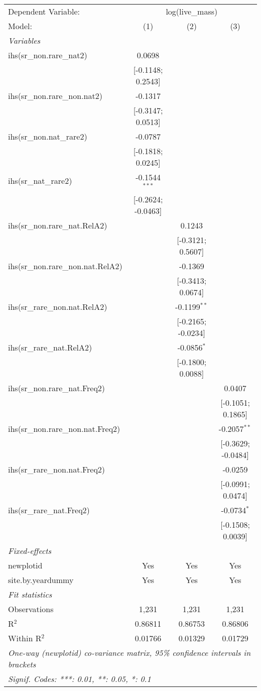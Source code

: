 \begin{tabular}{lccc}
\tabularnewline\midrule\midrule
Dependent Variable:&\multicolumn{3}{c}{log(live\_mass)}\\
Model:&(1) & (2) & (3)\\
\midrule \emph{Variables}&   &   &  \\
ihs(sr\_non.rare\_nat2)&0.0698 &    &   \\
  &[-0.1148; 0.2543] &    &   \\
ihs(sr\_non.rare\_non.nat2)&-0.1317 &    &   \\
  &[-0.3147; 0.0513] &    &   \\
ihs(sr\_non.nat\_rare2)&-0.0787 &    &   \\
  &[-0.1818; 0.0245] &    &   \\
ihs(sr\_nat\_rare2)&-0.1544$^{***}$ &    &   \\
  &[-0.2624; -0.0463] &    &   \\
ihs(sr\_non.rare\_nat.RelA2)&   & 0.1243 &   \\
  &   & [-0.3121; 0.5607] &   \\
ihs(sr\_non.rare\_non.nat.RelA2)&   & -0.1369 &   \\
  &   & [-0.3413; 0.0674] &   \\
ihs(sr\_rare\_non.nat.RelA2)&   & -0.1199$^{**}$ &   \\
  &   & [-0.2165; -0.0234] &   \\
ihs(sr\_rare\_nat.RelA2)&   & -0.0856$^{*}$ &   \\
  &   & [-0.1800; 0.0088] &   \\
ihs(sr\_non.rare\_nat.Freq2)&   &    & 0.0407\\
  &   &    & [-0.1051; 0.1865]\\
ihs(sr\_non.rare\_non.nat.Freq2)&   &    & -0.2057$^{**}$\\
  &   &    & [-0.3629; -0.0484]\\
ihs(sr\_rare\_non.nat.Freq2)&   &    & -0.0259\\
  &   &    & [-0.0991; 0.0474]\\
ihs(sr\_rare\_nat.Freq2)&   &    & -0.0734$^{*}$\\
  &   &    & [-0.1508; 0.0039]\\
\midrule \emph{Fixed-effects}&   &   &  \\
newplotid & Yes & Yes & Yes\\
site.by.yeardummy & Yes & Yes & Yes\\
\midrule \emph{Fit statistics}&  & & \\
Observations & 1,231&1,231&1,231\\
R$^2$ & 0.86811&0.86753&0.86806\\
Within R$^2$ & 0.01766&0.01329&0.01729\\
\midrule\midrule\multicolumn{4}{l}{\emph{One-way (newplotid) co-variance matrix, 95\% confidence intervals in brackets}}\\
\multicolumn{4}{l}{\emph{Signif. Codes: ***: 0.01, **: 0.05, *: 0.1}}\\
\end{tabular}


